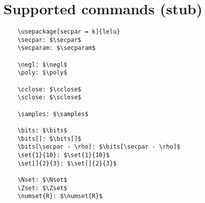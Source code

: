 \documentclass{article}
\begin{document}
\section{Supported commands (stub)}

\begin{lstlisting}
    \usepackage[secpar = k]{lelu}
    \secpar: $\secpar$
    \secparam: $\secparam$

    \negl: $\negl$
    \poly: $\poly$

    \cclose: $\cclose$
    \sclose: $\sclose$

    \samples: $\samples$

    \bits: $\bits$
    \bits[]: $\bits[]$
    \bits[\secpar - \rho]: $\bits[\secpar - \rho]$
    \set{1}{10}: $\set{1}{10}$
    \set[]{2}{3}: $\set[]{2}{3}$

    \Nset: $\Nset$
    \Zset: $\Zset$
    \numset{R}: $\numset{R}$

\end{lstlisting}
    
\end{document}
